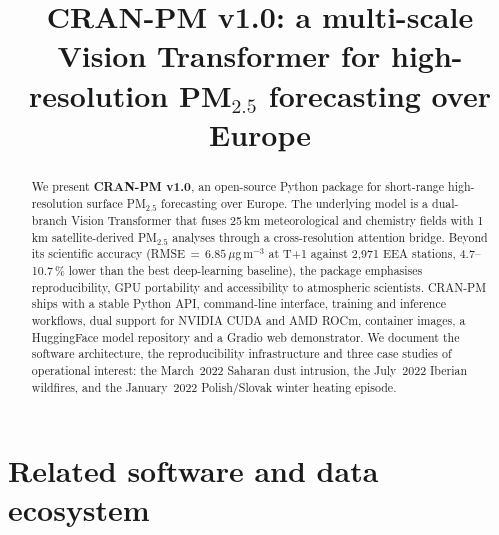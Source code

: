 \documentclass[gmd, manuscript]{copernicus}
\begin{document}
\title{CRAN-PM v1.0: a multi-scale Vision Transformer for high-resolution
PM$_{2.5}$ forecasting over Europe}





\received{}
\pubdiscuss{}
\revised{}
\accepted{}
\published{}


\maketitle

\begin{abstract}
We present \textbf{CRAN-PM v1.0}, an open-source Python package for
short-range high-resolution surface PM$_{2.5}$ forecasting over Europe.
The underlying model is a dual-branch Vision Transformer that fuses
25\,km meteorological and chemistry fields with 1\,km satellite-derived
PM$_{2.5}$ analyses through a cross-resolution attention bridge. Beyond
its scientific accuracy (RMSE\,$=\,6.85$\,$\mu$g\,m$^{-3}$ at T+1 against
2{,}971 EEA stations, 4.7--10.7\,\% lower than the best deep-learning
baseline), the package emphasises reproducibility, GPU portability and
accessibility to atmospheric scientists. CRAN-PM ships with a stable
Python API, command-line interface, training and inference workflows,
dual support for NVIDIA CUDA and AMD ROCm, container images, a
HuggingFace model repository and a Gradio web demonstrator. We document
the software architecture, the reproducibility infrastructure and three
case studies of operational interest: the March~2022 Saharan dust
intrusion, the July~2022 Iberian wildfires, and the January~2022
Polish/Slovak winter heating episode.
\end{abstract}


\introduction
\label{sec:intro}



\section{Related software and data ecosystem}
\label{sec:related}

\end{document}
